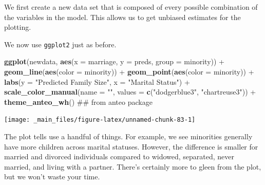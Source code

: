 \documentclass[]{tufte-book}
\newenvironment{Shaded}{}{}
\newcommand{\KeywordTok}[1]{\textcolor[rgb]{0.00,0.44,0.13}{\textbf{#1}}}
\newcommand{\DataTypeTok}[1]{\textcolor[rgb]{0.56,0.13,0.00}{#1}}
\newcommand{\StringTok}[1]{\textcolor[rgb]{0.25,0.44,0.63}{#1}}
\newcommand{\OperatorTok}[1]{\textcolor[rgb]{0.40,0.40,0.40}{#1}}
\newcommand{\NormalTok}[1]{#1}
\theoremstyle{definition}
\theoremstyle{definition}
\theoremstyle{remark}
\begin{document}
We first create a new data set that is composed of every possible
combination of the variables in the model. This allows us to get
unbiased estimates for the plotting.

\begin{Shaded}
\end{Shaded}

We now use \texttt{ggplot2} just as before.

\begin{Shaded}
\begin{Highlighting}[]
\KeywordTok{ggplot}\NormalTok{(newdata, }\KeywordTok{aes}\NormalTok{(}\DataTypeTok{x =}\NormalTok{ marriage, }\DataTypeTok{y =}\NormalTok{ preds, }\DataTypeTok{group =}\NormalTok{ minority)) }\OperatorTok{+}\StringTok{ }
\StringTok{    }\KeywordTok{geom_line}\NormalTok{(}\KeywordTok{aes}\NormalTok{(}\DataTypeTok{color =}\NormalTok{ minority)) }\OperatorTok{+}\StringTok{ }\KeywordTok{geom_point}\NormalTok{(}\KeywordTok{aes}\NormalTok{(}\DataTypeTok{color =}\NormalTok{ minority)) }\OperatorTok{+}\StringTok{ }
\StringTok{    }\KeywordTok{labs}\NormalTok{(}\DataTypeTok{y =} \StringTok{"Predicted Family Size"}\NormalTok{, }\DataTypeTok{x =} \StringTok{"Marital Status"}\NormalTok{) }\OperatorTok{+}\StringTok{ }
\StringTok{    }\KeywordTok{scale_color_manual}\NormalTok{(}\DataTypeTok{name =} \StringTok{""}\NormalTok{, }\DataTypeTok{values =} \KeywordTok{c}\NormalTok{(}\StringTok{"dodgerblue3"}\NormalTok{, }
        \StringTok{"chartreuse3"}\NormalTok{)) }\OperatorTok{+}\StringTok{ }\KeywordTok{theme_anteo_wh}\NormalTok{()  ## from anteo package}
\end{Highlighting}
\end{Shaded}

\texttt{[image: \_main\_files/figure-latex/unnamed-chunk-83-1]}

The plot tells use a handful of things. For example, we see minorities
generally have more children across marital statuses. However, the
difference is smaller for married and divorced individuals compared to
widowed, separated, never married, and living with a partner. There's
certainly more to gleen from the plot, but we won't waste your time.
\end{document}
